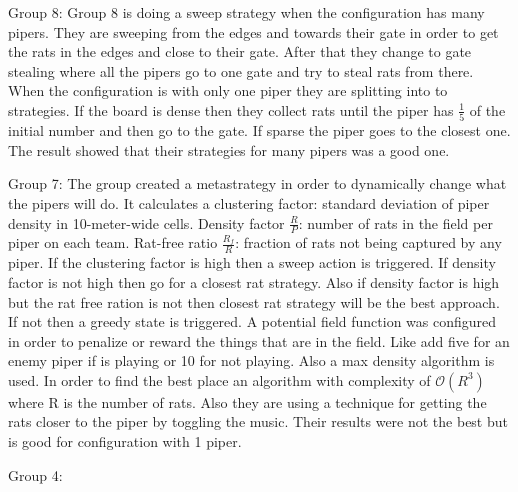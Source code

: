Group 8:
Group 8 is doing a sweep strategy when the configuration has many pipers. They 
are sweeping from the edges and towards their gate in order to get the rats in 
the edges and close to their gate. After that they change to gate stealing where
all the pipers go to one gate and try to steal rats from there. When the 
configuration is with only one piper they are splitting into to strategies. If 
the board is dense then they collect rats until the piper has $\frac{1}{5}$ of 
the initial number and then go to the gate. If sparse the piper goes to the 
closest one. The result showed that their strategies for many pipers was a good 
one.

Group 7:
The group created a metastrategy in order to dynamically change what the pipers 
will do. It calculates a clustering factor: standard deviation of piper density 
in 10-meter-wide cells. Density factor $\frac{R}{P}$: number of rats in the field 
per piper on each team. Rat-free ratio $\frac{R_f}{R}$: fraction of rats not being 
captured by any piper. If the clustering factor is high then a sweep action is
triggered. If density factor is not high then go for a closest rat strategy. Also
if density factor is high but the rat free ration is not then closest rat strategy
will be the best approach. If not then a greedy state is triggered. A potential
field function was configured in order to penalize or reward the things that are
in the field. Like add five for an enemy piper if is playing or 10 for not playing.
Also a max density algorithm is used. In order to find the best place an algorithm
with complexity of $\mathcal{O}(R^3)$ where R is the number of rats. Also they
are using a technique for getting the rats closer to the piper by toggling the
music. Their results were not the best but is good for configuration with 1 piper.

Group 4:

 




